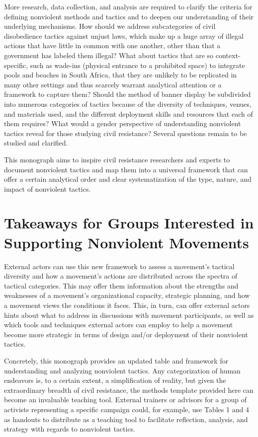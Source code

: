 \documentclass[twoside,a4paper,12pt,fleqn,openany]{extbook}
\begin{document}
More research, data collection, and analysis are required to clarify the criteria for defining nonviolent methods and tactics and to deepen our understanding of their underlying mechanisms. How should we address subcategories of civil disobedience tactics against unjust laws, which make up a huge array of illegal actions that have little in common with one another, other than that a government has labeled them illegal? What about tactics that are so context-specific, such as wade-ins (physical entrance to a prohibited space) to integrate pools and beaches in South Africa, that they are unlikely to be replicated in many other settings and thus scarcely warrant analytical attention or a framework to capture them? Should the method of banner display be subdivided into numerous categories of tactics because of the diversity of techniques, venues, and materials used, and the different deployment skills and resources that each of them requires? What would a gender perspective of understanding nonviolent tactics reveal for those studying civil resistance? Several questions remain to be studied and clarified.

This monograph aims to inspire civil resistance researchers and experts to document nonviolent tactics and map them into a universal framework that can offer a certain analytical order and clear systematization of the type, nature, and impact of nonviolent tactics.

\section*{Takeaways for Groups Interested in Supporting Nonviolent Movements}

External actors can use this new framework to assess a movement’s tactical diversity and how a movement’s actions are distributed across the spectra of tactical categories. This may offer them information about the strengths and weaknesses of a movement’s organizational capacity, strategic planning, and how a movement views the conditions it faces. This, in turn, can offer external actors hints about what to address in discussions with movement participants, as well as which tools and techniques external actors can employ to help a movement become more strategic in terms of design and/or deployment of their nonviolent tactics.

Concretely, this monograph provides an updated table and framework for understanding and analyzing nonviolent tactics. Any categorization of human endeavors is, to a certain extent, a simplification of reality, but given the extraordinary breadth of civil resistance, the methods template provided here can become an invaluable teaching tool. External trainers or advisors for a group of activists representing a specific campaign could, for example, use Tables 1 and 4 as handouts to distribute as a teaching tool to facilitate reflection, analysis, and strategy with regards to nonviolent tactics.
\end{document}
